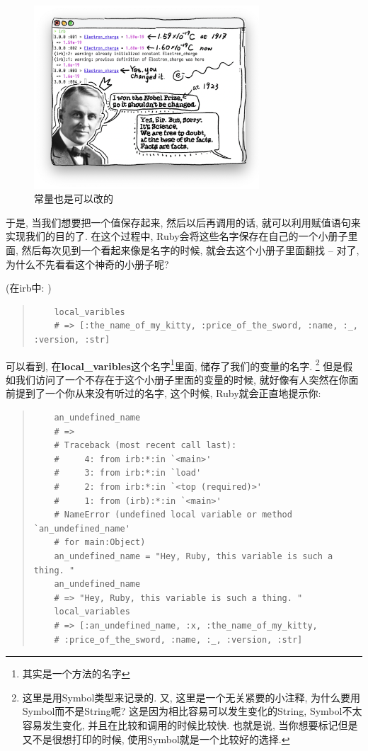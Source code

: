 \begin{figure}[h]
  \centering
  \includegraphics[width=0.75\textwidth]{image/chapter/1_language/constant.png}
  \caption{常量也是可以改的}
\end{figure}

于是, 当我们想要把一个值保存起来, 然后以后再调用的话, 就可以利用赋值语句来实现我们的目的了. 在这个过程中, Ruby会将这些名字保存在自己的一个小册子里面, 然后每次见到一个看起来像是名字的时候, 就会去这个小册子里面翻找 -- 对了, 为什么不先看看这个神奇的小册子呢? 

(在irb中: )

\begin{quotation}
  \begin{verbatim}
    local_varibles
    # => [:the_name_of_my_kitty, :price_of_the_sword, :name, :_, :version, :str]
  \end{verbatim}
\end{quotation}

可以看到, 在\textbf{local\_varibles}这个名字\footnote{其实是一个方法的名字}里面, 储存了我们的变量的名字. \footnote{这里是用Symbol类型来记录的. 又, 这里是一个无关紧要的小注释, 为什么要用Symbol而不是String呢? 这是因为相比容易可以发生变化的String, Symbol不太容易发生变化, 并且在比较和调用的时候比较快. 也就是说, 当你想要标记但是又不是很想打印的时候, 使用Symbol就是一个比较好的选择. } 但是假如我们访问了一个不存在于这个小册子里面的变量的时候, 就好像有人突然在你面前提到了一个你从来没有听过的名字, 这个时候, Ruby就会正直地提示你: 

\begin{quotation}
  \begin{verbatim}
    an_undefined_name
    # => 
    # Traceback (most recent call last):
    #     4: from irb:*:in `<main>'
    #     3: from irb:*:in `load'
    #     2: from irb:*:in `<top (required)>'
    #     1: from (irb):*:in `<main>'
    # NameError (undefined local variable or method `an_undefined_name' 
    # for main:Object)
    an_undefined_name = "Hey, Ruby, this variable is such a thing. "
    an_undefined_name
    # => "Hey, Ruby, this variable is such a thing. "
    local_variables
    # => [:an_undefined_name, :x, :the_name_of_my_kitty, 
    # :price_of_the_sword, :name, :_, :version, :str]
  \end{verbatim}
\end{quotation}

